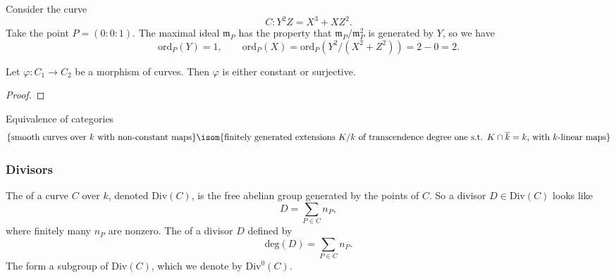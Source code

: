 \begin{example}
    Consider the curve
    \[ C \colon Y^2 Z = X^3 + X Z^2 . \]
    Take the point $P = (0 : 0 : 1)$. The maximal ideal $\mathfrak{m}_P$ has the property that $\mathfrak{m}_P / \mathfrak{m}_P^2$ is generated by $Y$, so we have
    \[
        \text{ord}_P(Y) = 1, \qquad
        \text{ord}_P(X) = \text{ord}_P(Y^2 / (X^2 + Z^2))
        = 2 - 0 = 2 . \]
\end{example}




\begin{theorem}
    Let $\varphi \colon C_1 \to C_2$ be a morphism of curves. Then $\varphi$ is either constant or surjective.
\end{theorem}

\begin{proof}
\end{proof}

\begin{theorem}
    Equivalence of categories
    \[ \{ \text{smooth curves over $k$ with non-constant maps} \} \isom \\ \{ \text{finitely generated extensions $K/k$ of transcendence degree one s.t. $K \cap \overline{k} = k$, with $k$-linear maps} \} \]
\end{theorem}


\subsubsection{Divisors}

\begin{definition}
    The  of a curve $C$ over $k$, denoted $\text{Div}(C)$, is the free abelian group generated by the points of $C$. So a divisor $D \in \text{Div}(C)$ looks like
    \[ D = \sum_{P \in C} n_P , \]
    where finitely many $n_P$ are nonzero.
    The  of a divisor $D$ defined by
    \[ \text{deg}(D) = \sum_{P \in C} n_P . \]
    The  form a subgroup of $\text{Div}(C)$, which we denote by $\text{Div}^0(C)$.
\end{definition}


